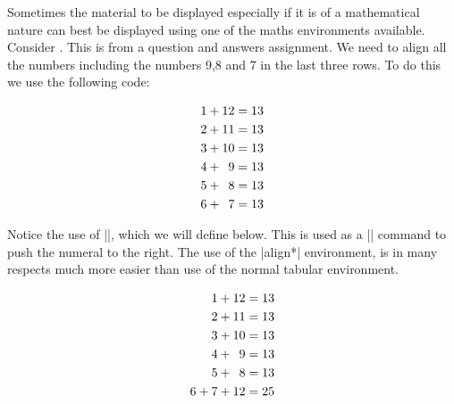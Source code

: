 \begin{multicols}{2}
Sometimes the material to be displayed especially if it is of a mathematical nature can best be displayed using one of the maths environments available. Consider . This is from a question and answers assignment. We need to align all the numbers including the numbers 9,8 and 7 in the last three rows.
To do this we use the following code:
\medskip
{}
\begin{teXXX}
\begin{align*}
  1 +  12 &= 13\\
  2 +  11 &= 13\\
  3 +  10 &= 13\\
  4 + \Z9 &= 13\\
  5 + \Z8 &= 13\\
  6 + \Z7 &= 13
\end{align*}
\end{teXXX}
\medskip

Notice the use of |\Z|, which we will define below. This is used as a |\phantom|
command to push the numeral to the right. The use of the |align*| environment, is in many respects much more easier than use of the normal tabular environment.

\columnbreak

\begin{align*}
1 +  12 &= 13\\
2 +  11 &= 13\\
3 +  10 &= 13\\
4 + \Z9 &= 13\\
5 + \Z8 &= 13\\
6 + 7 + 12&= 25
\end{align*}
\label{fig:align}
\medskip
\end{multicols}


